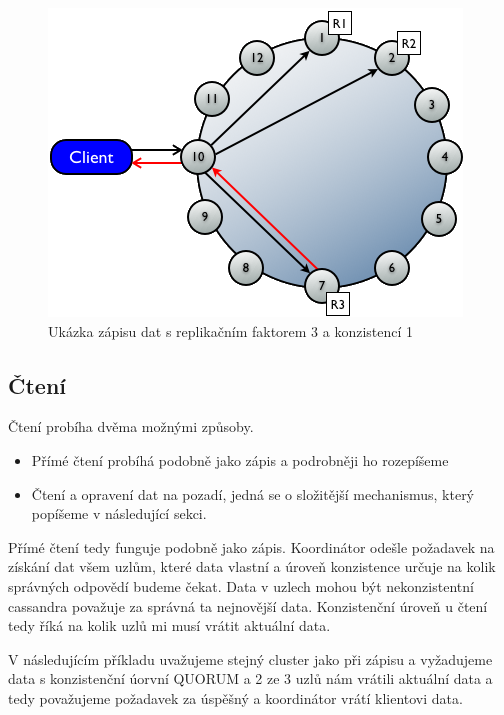 \begin{figure}[h]
\centering
\includegraphics[scale=0.5]{images/write}
\caption{Ukázka zápisu dat s replikačním faktorem 3 a konzistencí 1}
\label{fig:vnodes}
\end{figure}


\subsection{Čtení}
Čtení probíha dvěma možnými způsoby.

\begin{itemize}
\item Přímé čtení probíhá podobně jako zápis a podrobněji ho rozepíšeme
\item Čtení a opravení dat na pozadí, jedná se o složitější mechanismus, který popíšeme v následující sekci.
\end{itemize}

Přímé čtení tedy funguje podobně jako zápis. Koordinátor odešle požadavek na získání dat všem uzlům, které data vlastní a úroveň konzistence určuje na kolik správných odpovědí budeme čekat. Data v uzlech mohou být nekonzistentní cassandra považuje za správná ta nejnovější data. Konzistenční úroveň u čtení tedy říká na kolik uzlů mi musí vrátit aktuální data. 

V následujícím příkladu uvažujeme stejný cluster jako při zápisu a vyžadujeme data s konzistenční úorvní QUORUM a 2 ze 3 uzlů nám vrátili aktuální data a tedy považujeme požadavek za úspěšný a koordinátor vrátí klientovi data.



